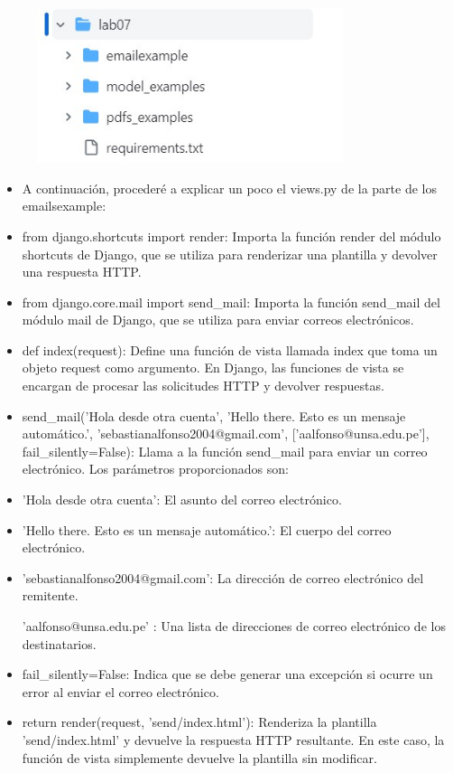 \begin{figure}[H]
	\centering
	\includegraphics[width=0.8\textwidth,keepaspectratio]{img/estructura7.jpg}
\end{figure}

\begin{itemize}
        \item A continuación, procederé a explicar un poco el views.py de la parte de los emailsexample:
        \item from django.shortcuts import render: Importa la función render del módulo shortcuts de Django, que se utiliza para renderizar una plantilla y devolver una respuesta HTTP.
        \item from django.core.mail import send_mail: Importa la función send_mail del módulo mail de Django, que se utiliza para enviar correos electrónicos.
        \item def index(request): Define una función de vista llamada index que toma un objeto request como argumento. En Django, las funciones de vista se encargan de procesar las solicitudes HTTP y devolver respuestas.
        \item send_mail('Hola desde otra cuenta', 'Hello there. Esto es un mensaje automático.', 'sebastianalfonso2004@gmail.com', ['aalfonso@unsa.edu.pe'], fail_silently=False): Llama a la función send_mail para enviar un correo electrónico. Los parámetros proporcionados son:
        \item 'Hola desde otra cuenta': El asunto del correo electrónico.
        \item 'Hello there. Esto es un mensaje automático.': El cuerpo del correo electrónico.
        \item 'sebastianalfonso2004@gmail.com': La dirección de correo electrónico del remitente.
        \item ['aalfonso@unsa.edu.pe']: Una lista de direcciones de correo electrónico de los destinatarios.
        \item fail_silently=False: Indica que se debe generar una excepción si ocurre un error al enviar el correo electrónico.
        \item return render(request, 'send/index.html'): Renderiza la plantilla 'send/index.html' y devuelve la respuesta HTTP resultante. En este caso, la función de vista simplemente devuelve la plantilla sin modificar.
\end{itemize}
